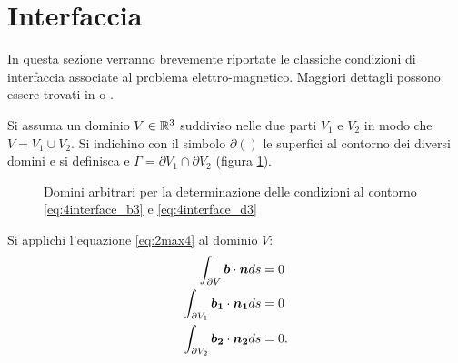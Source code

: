 



\label{cap:boundary}
\section{Interfaccia}
In questa sezione verranno brevemente riportate le classiche condizioni di interfaccia associate al problema elettro-magnetico. 
Maggiori dettagli possono essere trovati in \citep{zaglmayr_high_2006} o \citep{markus_zahn_electromagnetic_????}.
 
Si assuma un dominio $V \in \mathbb{R}^3$ suddiviso nelle due parti $V_1$ e $V_2$ in modo che $V = V_1 \cup V_2$. Si indichino con il simbolo $\partial\left(\right)$ le superfici al contorno dei diversi domini e si definisca e $\Gamma = \partial V_1 \cap \partial V_2$ (figura \ref{fig:4.7}).

\begin{figure}
\centering
\caption{Domini arbitrari per la determinazione delle condizioni al contorno \eqref{eq:4interface_b3} e \eqref{eq:4interface_d3}}
\label{fig:4.7}
\end{figure}

Si applichi l'equazione \eqref{eq:2max4} al dominio $V$:
\begin{align}
\label{eq:4interface_b}
\int_{\partial V} \boldsymbol{b}\cdot \boldsymbol{n} ds &= 0\\
\int_{\partial V_1} \boldsymbol{b_1}\cdot \boldsymbol{n_1} ds &= 0\\
\int_{\partial V_2} \boldsymbol{b_2}\cdot \boldsymbol{n_2} ds &= 0.
\end{align}

